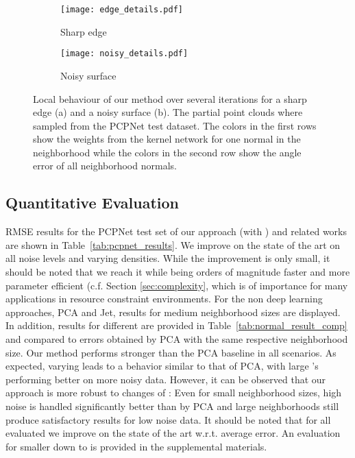 \documentclass[10pt,twocolumn,letterpaper]{article}
\begin{document}
\begin{figure*}[t]
\begin{subfigure}[t]{0.5\textwidth}
    \texttt{[image: edge\_details.pdf]}
    \caption{Sharp edge}\label{fig:edge_details}
  \end{subfigure}
  \hfill
  \begin{subfigure}[t]{0.5\textwidth}
    \texttt{[image: noisy\_details.pdf]}
    \caption{Noisy surface}\label{fig:noisy_details}
  \end{subfigure}
  \caption{Local behaviour of our method over several iterations for a sharp edge (a) and a noisy surface (b). The partial point clouds where sampled from the PCPNet test dataset. The colors in the first rows show the weights from the kernel network for one normal in the neighborhood while the colors in the second row show the angle error of all neighborhood normals.}\label{fig:local_views}

\end{figure*}


\subsection{Quantitative Evaluation}
\label{sec:quantitative}
RMSE results for the PCPNet test set of our approach (with ) and related 
works are shown in Table~\ref{tab:pcpnet_results}.  We improve on the
state of the art on all noise levels and varying densities. While the improvement is only small, it should be noted that we reach it while being orders of magnitude faster and more parameter efficient (c.f. Section \ref{sec:complexity}, which is of importance for many applications in resource constraint environments. For the non deep
learning approaches, PCA and Jet, results for medium neighborhood sizes are
displayed. 
In addition, results for different  are provided in 
Table~\ref{tab:normal_result_comp} and compared to errors obtained by PCA with the
same respective neighborhood size. Our method performs stronger than the PCA baseline in all scenarios. 
As expected, varying  leads to a behavior similar to that of PCA, with large 
's performing better on more noisy data. However, it can be observed that our 
approach is more robust to changes of : Even for small neighborhood sizes, high 
noise is handled significantly better than by PCA and large neighborhoods still 
produce satisfactory results for low noise data. 
It should be noted that for all evaluated  we improve on the state of the
art w.r.t. average error. An evaluation for smaller  down to  is provided in the supplemental materials.
\end{document}
